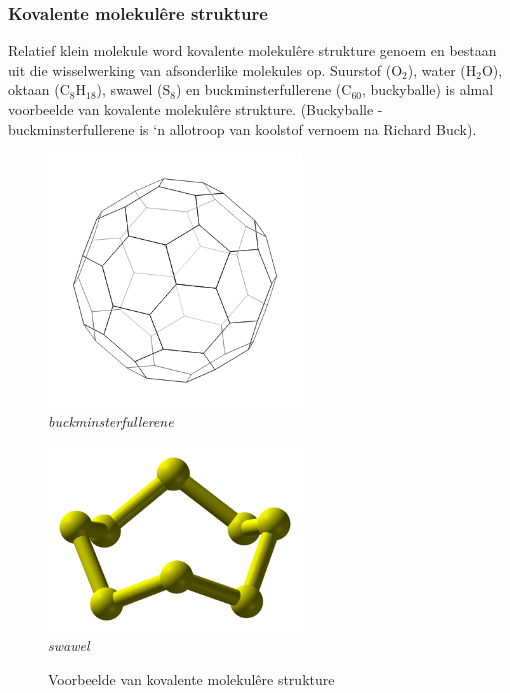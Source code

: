 \subsubsection*{Kovalente molekul\^{e}re strukture}
Relatief klein molekule word kovalente molekulêre strukture genoem en bestaan uit die wisselwerking van afsonderlike molekules op. Suurstof ($\text{O}_{2}$), water ($\text{H}_{2}\text{O}$), oktaan ($\text{C}_{8}\text{H}_{18}$), swawel ($\text{S}_{8}$) en buckminsterfullerene ($\text{C}_{60}$, buckyballe) is almal voorbeelde van kovalente molekulêre strukture. (Buckyballe - buckminsterfullerene is ‘n allotroop van koolstof vernoem na Richard Buck).\\
\begin{figure}[H]
  \begin{center}
  \begin{minipage}[c]{5 cm}
    \includegraphics[width=0.6\textwidth]{photos/Buckyball_Carbon.png} \\
    \textsl{buckminsterfullerene}
  \end{minipage}
  \begin{minipage}[c]{5 cm}
    \includegraphics[width=0.6\textwidth]{photos/sulphur_wikipedia.png}  \\ 
    \textsl{swawel}
  \end{minipage}
\caption{Voorbeelde van kovalente molekul\^{e}re strukture}
\end{center}
\end{figure}

